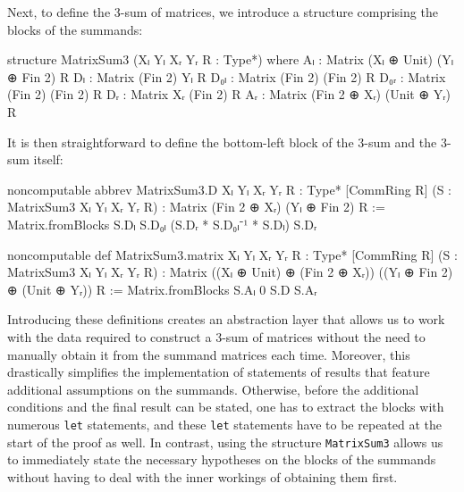 Next, to define the 3-sum of matrices, we introduce a structure comprising the blocks of the summands:
\begin{leancode}
structure MatrixSum3 (Xₗ Yₗ Xᵣ Yᵣ R : Type*) where
  Aₗ : Matrix (Xₗ ⊕ Unit) (Yₗ ⊕ Fin 2) R
  Dₗ : Matrix (Fin 2) Yₗ R
  D₀ₗ : Matrix (Fin 2) (Fin 2) R
  D₀ᵣ : Matrix (Fin 2) (Fin 2) R
  Dᵣ : Matrix Xᵣ (Fin 2) R
  Aᵣ : Matrix (Fin 2 ⊕ Xᵣ) (Unit ⊕ Yᵣ) R
\end{leancode}
It is then straightforward to define the bottom-left block of the 3-sum and the 3-sum itself:
\begin{leancode}
noncomputable abbrev MatrixSum3.D
    {Xₗ Yₗ Xᵣ Yᵣ R : Type*} [CommRing R]
    (S : MatrixSum3 Xₗ Yₗ Xᵣ Yᵣ R) :
    Matrix (Fin 2 ⊕ Xᵣ) (Yₗ ⊕ Fin 2) R :=
  Matrix.fromBlocks
    S.Dₗ S.D₀ₗ (S.Dᵣ * S.D₀ₗ⁻¹ * S.Dₗ) S.Dᵣ
\end{leancode}
\begin{leancode}
noncomputable def MatrixSum3.matrix
    {Xₗ Yₗ Xᵣ Yᵣ R : Type*} [CommRing R]
    (S : MatrixSum3 Xₗ Yₗ Xᵣ Yᵣ R) :
    Matrix ((Xₗ ⊕ Unit) ⊕ (Fin 2 ⊕ Xᵣ))
           ((Yₗ ⊕ Fin 2) ⊕ (Unit ⊕ Yᵣ)) R :=
  Matrix.fromBlocks S.Aₗ 0 S.D S.Aᵣ
\end{leancode}
Introducing these definitions creates an abstraction layer that allows us to work with the data required to construct a 3-sum of matrices without the need to manually obtain it from the summand matrices each time. Moreover, this drastically simplifies the implementation of statements of results that feature additional assumptions on the summands. Otherwise, before the additional conditions and the final result can be stated, one has to extract the blocks with numerous \texttt{let} statements, and these \texttt{let} statements have to be repeated at the start of the proof as well. In contrast, using the structure \texttt{MatrixSum3} allows us to immediately state the necessary hypotheses on the blocks of the summands without having to deal with the inner workings of obtaining them first.

